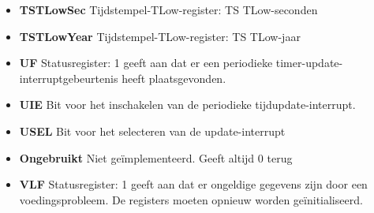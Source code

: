 \begin{itemize}
\item{\bf{TSTLowSec}} Tijdstempel-TLow-register: TS TLow-seconden
\item{\bf{TSTLowYear}} Tijdstempel-TLow-register: TS TLow-jaar
\item{\bf{UF}} Statusregister: 1 geeft aan dat er een periodieke timer-update-interruptgebeurtenis heeft plaatsgevonden.
\item{\bf{UIE}} Bit voor het inschakelen van de periodieke tijdupdate-interrupt.
\item{\bf{USEL}} Bit voor het selecteren van de update-interrupt
\item{\bf{Ongebruikt}} Niet geïmplementeerd. Geeft altijd 0 terug
\item{\bf{VLF}} Statusregister: 1 geeft aan dat er ongeldige gegevens zijn door een voedingsprobleem. De registers moeten opnieuw worden geïnitialiseerd.
\end{itemize}
